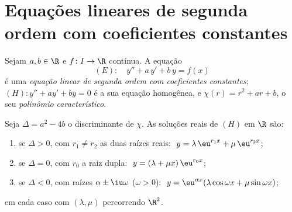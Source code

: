 \section{Equações lineares de segunda ordem com coeficientes constantes}

\begin{definition}\label{def:b1:diffeq:linear2}
Sejam $a, b \in \R$ e $f \colon I \to \R$ contínua. A equação
\[
(E)\colon\quad y'' + a\,y' + b\,y = f(x)
\]
é uma \emph{equação linear de segunda ordem com coeficientes
constantes};
$(H)\colon y'' + ay' + by = 0$ é a sua equação homogênea, e
$\chi(r) = r^2 + ar + b$, o seu \emph{polinômio
característico}.
\end{definition}

\begin{theorem}\label{thm:b1:diffeq:homogeneous2}
Seja $\Delta = a^2 - 4b$ o discriminante de $\chi$. As soluções
reais de $(H)$ em $\R$ são:
\begin{enumerate}
  \item se $\Delta > 0$, com $r_1 \neq r_2$ as duas raízes reais:
        $\;y = \lambda\, \eu^{r_1 x} + \mu\, \eu^{r_2 x}$;
  \item se $\Delta = 0$, com $r_0$ a raiz dupla:
        $\;y = (\lambda + \mu x)\, \eu^{r_0 x}$;
  \item se $\Delta < 0$, com raízes $\alpha \pm \iu\omega$
        ($\omega > 0$):
        $\;y = \eu^{\alpha x} (\lambda \cos\omega x + \mu
        \sin\omega x)$;
\end{enumerate}
em cada caso com $(\lambda, \mu)$ percorrendo $\R^2$.
\end{theorem}

